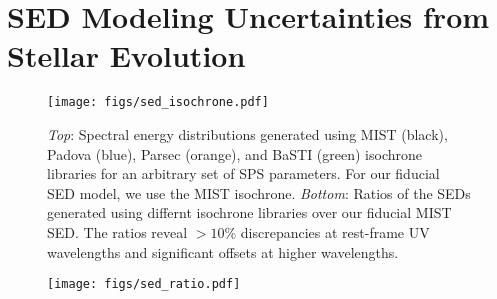 \section{SED Modeling Uncertainties from Stellar Evolution} \label{sec:theory} 

\begin{figure}
\begin{center}
\texttt{[image: figs/sed\_isochrone.pdf]}
\caption{
    {\em Top}: 
    Spectral energy distributions generated using MIST (black), Padova (blue),
    Parsec (orange), and BaSTI (green) isochrone libraries for an arbitrary set
    of SPS parameters. 
    For our fiducial SED model, we use the MIST isochrone. 
    {\em Bottom}:
    Ratios of the SEDs generated using differnt isochrone libraries over our
    fiducial MIST SED. 
    The ratios reveal $>10\%$ discrepancies at rest-frame UV wavelengths and
    significant offsets at higher wavelengths. 
    } \label{fig:sed_iso}
\end{center}
\end{figure}


\begin{figure}
\begin{center}
\texttt{[image: figs/sed\_ratio.pdf]}
\caption{
    } \label{fig:sed_ratio}
\end{center}
\end{figure}

